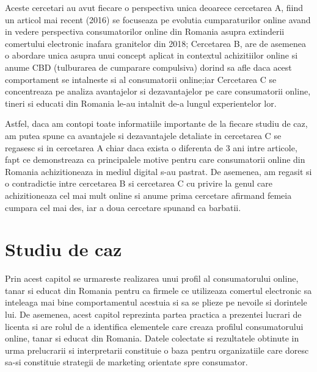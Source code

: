 \documentclass[a4paper, 12pt]{article}
\begin{document}
\bigskip
		\quad Aceste cercetari au avut fiecare o perspectiva unica deoarece cercetarea A, fiind un articol mai recent (2016) se focuseaza pe evolutia cumparaturilor online avand in vedere perspectiva consumatorilor online din Romania asupra extinderii comertului electronic inafara granitelor din 2018; Cercetarea B, are de asemenea o abordare unica asupra unui concept aplicat in contextul achizitiilor online si anume CBD (tulburarea de cumparare compulsiva) dorind sa afle daca acest comportament se intalneste si al consumatorii online;iar Cercetarea C se concentreaza pe analiza avantajelor si dezavantajelor pe care consumatorii online, tineri si educati din Romania le-au intalnit de-a lungul experientelor lor.
		 
		\quad Astfel, daca am contopi toate informatiile importante de la fiecare studiu de caz, am putea spune ca avantajele si dezavantajele detaliate in cercetarea C se regasesc si in cercetarea A chiar daca exista o diferenta de 3 ani intre articole, fapt ce demonstreaza ca principalele motive pentru care consumatorii online din Romania achizitioneaza in mediul digital s-au pastrat. De asemenea, am regasit si o contradictie intre cercetarea B si cercetarea C cu privire la genul care achizitioneaza cel mai mult online si anume prima cercetare afirmand femeia cumpara cel mai des, iar a doua cercetare spunand ca barbatii.
	
	
	
\newpage	
	\section{Studiu de caz }
	
	\quad\quad  Prin acest capitol se urmareste realizarea unui profil al consumatorului online, tanar si educat din Romania pentru ca firmele ce utilizeaza comertul electronic sa inteleaga mai bine comportamentul acestuia si sa se plieze pe nevoile si dorintele lui. De asemenea, acest capitol reprezinta partea practica a prezentei lucrari de licenta si are rolul de a identifica elementele care creaza profilul consumatorului online, tanar si educat din Romania. Datele colectate si rezultatele obtinute in urma prelucrarii si interpretarii constituie o baza pentru organizatiile care doresc sa-si constituie strategii de marketing orientate spre consumator.
\end{document}
